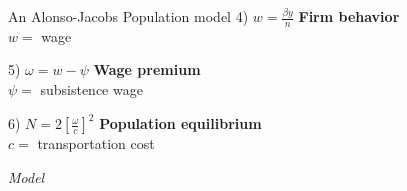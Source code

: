 \documentclass[]{beamer} %
\begin{document}
\begin{frame}{An Alonso-Jacobs Population model}%
\huge 
4) $w=\frac{\beta y} {n}$ { \hfill\Large \textbf{Firm behavior}\\\hfill \normalsize$ w =$ wage}
\vspace{.5cm}

5) $\omega=w-\psi$ { \hfill\large  \textbf{Wage premium}\\\hfill\Large $ \psi=$ subsistence wage}
\vspace{.5cm}

{\color{green!50!black}6) $N= 2\left[\frac{\omega}{c}\right]^2$ { \hfill \textbf{\Large  Population equilibrium}}\\
\normalsize \hfill $ c=$ transportation cost}

\end{frame}

\begin{frame}{}
  \centering \Huge
  \emph{Model}  
\end{frame}

\end{document}
